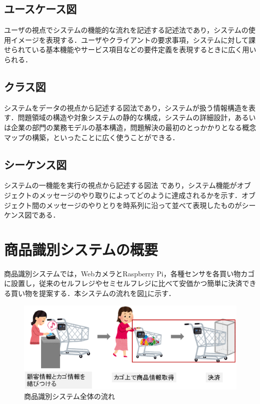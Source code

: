 \subsection*{ユースケース図}

ユーザの視点でシステムの機能的な流れを記述する記述法\cite{soft}であり，システムの使用イメージを表現する．ユーザやクライアントの要求事項，システムに対して課せられている基本機能やサービス項目などの要件定義を表現するときに広く用いられる\cite{uml}．

\subsection*{クラス図}

システムをデータの視点から記述する図法\cite{soft}であり，システムが扱う情報構造を表す．問題領域の構造や対象システムの静的な構成，システムの詳細設計，あるいは企業の部門の業務モデルの基本構造，問題解決の最初のとっかかりとなる概念マップの構築，といったことに広く使\cite{uml}うことができる．

\subsection*{シーケンス図}

システムの一機能を実行の視点から記述する図法\cite{soft}	であり，システム機能がオブジェクトのメッセージのやり取りによってどのように達成されるかを示す．オブジェクト間のメッセージのやりとりを時系列に沿って並べて表現したもの\cite{uml}がシーケンス図である．


\section{商品識別システムの概要}

商品識別システムでは，WebカメラとRaspberry Pi，各種センサを各買い物カゴに設置し，従来のセルフレジやセミセルフレジに比べて安価かつ簡単に決済できる買い物を提案する．本システムの流れを図\ref{summary1}に示す．


\begin{figure}[htbp]
\centering
\includegraphics[width = 15cm]{./picture/summary1.eps}
\caption{商品識別システム全体の流れ}
\label{summary1}
\end{figure}



